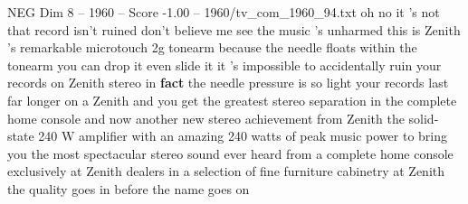 \begin{textsample}{NEG Dim 8 – 1960 – Score -1.00 – 1960/tv\_com\_1960\_94.txt}  \label{ex:f8_neg_038}
oh no it 's not that record isn't ruined don't believe me see the music 's unharmed this is Zenith 's remarkable microtouch 2g tonearm because the needle floats within the tonearm you can drop it even slide it it 's impossible to accidentally ruin your records on Zenith stereo in \textbf{fact} the needle pressure is so light your records last far longer on a Zenith and you get the greatest stereo separation in the complete home console and now another new stereo achievement from Zenith the solid-state 240 W amplifier with an amazing 240 watts of peak music power to bring you the most spectacular stereo sound ever heard from a complete home console exclusively at Zenith dealers in a selection of fine furniture cabinetry at Zenith the quality goes in before the name goes on

\end{textsample}
